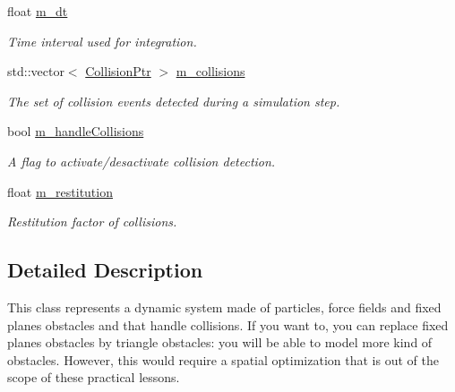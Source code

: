 \begin{DoxyCompactItemize}
float \hyperlink{classDynamicSystem_a544982347cb2e35838fc33c26f3ba1a9}{m\+\_\+dt}
\begin{DoxyCompactList}\small\item\em Time interval used for integration. \end{DoxyCompactList}\item 
std\+::vector$<$ \hyperlink{Collision_8hpp_a09bec6f7016794231a72a7e325436608}{Collision\+Ptr} $>$ \hyperlink{classDynamicSystem_af59c6816c0517d44241fc85dfcd5098a}{m\+\_\+collisions}
\begin{DoxyCompactList}\small\item\em The set of collision events detected during a simulation step. \end{DoxyCompactList}\item 
bool \hyperlink{classDynamicSystem_ac0881dce496ee154df62f6d77623908d}{m\+\_\+handle\+Collisions}
\begin{DoxyCompactList}\small\item\em A flag to activate/desactivate collision detection. \end{DoxyCompactList}\item 
float \hyperlink{classDynamicSystem_aac91bdfa64bc41fcf1284547b7201e03}{m\+\_\+restitution}
\begin{DoxyCompactList}\small\item\em Restitution factor of collisions. \end{DoxyCompactList}\end{DoxyCompactItemize}


\subsection{Detailed Description}
This class represents a dynamic system made of particles, force fields and fixed planes obstacles and that handle collisions. If you want to, you can replace fixed planes obstacles by triangle obstacles\+: you will be able to model more kind of obstacles. However, this would require a spatial optimization that is out of the scope of these practical lessons. 

